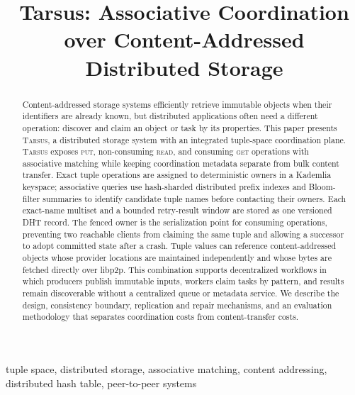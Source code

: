 \documentclass[conference]{IEEEtran}
\newcommand{\system}{\textsc{Tarsus}\xspace}
\newcommand{\putop}{\textsc{put}\xspace}
\newcommand{\readop}{\textsc{read}\xspace}
\newcommand{\getop}{\textsc{get}\xspace}
\begin{document}
\title{Tarsus: Associative Coordination over Content-Addressed
Distributed Storage}

\author{
}

\maketitle

\begin{abstract}
Content-addressed storage systems efficiently retrieve immutable objects when
their identifiers are already known, but distributed applications often need a
different operation: discover and claim an object or task by its properties.
This paper presents \system, a distributed storage system with an integrated
tuple-space coordination plane. \system exposes \putop, non-consuming \readop,
and consuming \getop operations with associative matching while keeping
coordination metadata separate from bulk content transfer. Exact tuple
operations are assigned to deterministic owners in a Kademlia keyspace;
associative queries use hash-sharded distributed prefix indexes and
Bloom-filter summaries to identify candidate tuple names before contacting
their owners. Each exact-name multiset and a bounded retry-result window are
stored as one versioned DHT record. The fenced owner is the serialization point
for consuming operations, preventing two reachable clients from claiming the
same tuple and allowing a successor to adopt committed state after a crash.
Tuple values can reference
content-addressed objects whose provider locations are maintained independently
and whose bytes are fetched directly over libp2p. This combination supports
decentralized workflows in which producers publish immutable inputs, workers
claim tasks by pattern, and results remain discoverable without a centralized
queue or metadata service. We describe the design, consistency boundary,
replication and repair mechanisms, and an evaluation methodology that separates
coordination costs from content-transfer costs.
\end{abstract}

\begin{IEEEkeywords}
tuple space, distributed storage, associative matching, content addressing,
distributed hash table, peer-to-peer systems
\end{IEEEkeywords}
\end{document}
